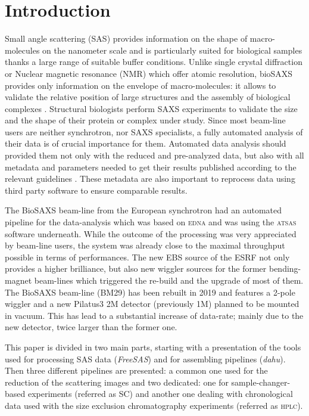 \documentclass[preprint]{iucr}              %
\begin{document}
\section{Introduction}
Small angle scattering (SAS) provides information on the shape of macro-molecules on the nanometer scale and is particularly suited for biological samples thanks a large range of suitable buffer conditions.
Unlike single crystal diffraction or Nuclear magnetic resonance (NMR) which offer atomic resolution, bioSAXS provides only information on the envelope of macro-molecules: it allows to validate the relative position of large structures and the assembly of biological complexes \cite{biosaxs_rev2018}. 
Structural biologists perform SAXS experiments to validate the size and the shape of their protein or complex under study. 
Since most beam-line users are neither synchrotron, nor SAXS specialists, a fully automated analysis of their data is of crucial importance for them. 
Automated data analysis should provided them not only with the reduced and pre-analyzed data, but also with all metadata and parameters needed to get their results published according to the relevant guidelines \cite{guidelines_2017}.
These metadata are also important to reprocess data using third party software to ensure comparable results. 

The BioSAXS beam-line from the European synchrotron \cite{BM29paper} had an automated pipeline for the data-analysis which was based on \textsc{edna} \cite{edna} and was using the \textsc{atsas} \cite{ATSAS2} software underneath. 
While the outcome of the processing was very appreciated by beam-line users, the system was already close to the maximal throughput possible in terms of performances. 
The new EBS source \cite{EBS} of the ESRF not only provides a higher brilliance, but also new wiggler sources for the former bending-magnet beam-lines which triggered the re-build and the upgrade of most of them. 
The BioSAXS beam-line (BM29) has been rebuilt in 2019 and features a 2-pole wiggler and a new Pilatus3 2M detector (previously 1M) planned to be mounted in vacuum. 
This has lead to a substantial increase of data-rate; mainly due to the new detector, twice larger than the former one. 

This paper is divided in two main parts, starting with a presentation of the tools used for 
processing SAS data (\textit{FreeSAS}) and for assembling pipelines (\textit{dahu}).
Then three different pipelines are presented: a common one used for the reduction of the scattering images and two dedicated: one for sample-changer-based experiments (referred as SC) and another one dealing with chronological data used with the size exclusion chromatography experiments (referred as \textsc{hplc}).
\end{document}
